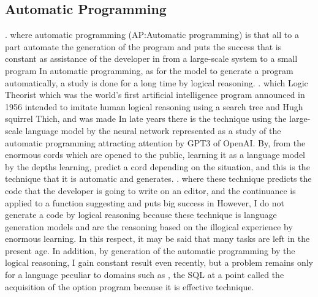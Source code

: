 \documentclass{article}
\begin{document}
\subsection{Automatic Programming}
\label{sec:headings}
\cite{AutomaticProgramming}. where automatic programming (AP:Automatic programming) is that all to a part automate the generation of the program and puts the success that is constant as assistance of the developer in from a large-scale system to a small program
In automatic programming, as for the model to generate a program automatically, a study is done for a long time by logical reasoning.
\cite{LogicTheorist}. which Logic Theorist which was the world's first artificial intelligence program announced in 1956 intended to imitate human logical reasoning using a search tree and Hugh squirrel Thich, and was made
In late years there is the technique using the large-scale language model by the neural network represented as a study of the automatic programming attracting attention by GPT3\cite{gpt3} of OpenAI.
By, from the enormous cords which are opened to the public, learning it as a language model by the depths learning, predict a cord depending on the situation, and this is the technique that it is automatic and generates.
\cite{copilot}. where these technique predicts the code that the developer is going to write on an editor, and the continuance is applied to a function suggesting and puts big success in
However, I do not generate a code by logical reasoning because these technique is language generation models and are the reasoning based on the illogical experience by enormous learning.
In this respect, it may be said that many tasks are left in the present age.
In addition, by generation of the automatic programming by the logical reasoning, I gain constant result even recently, but a problem remains only for a language peculiar to domains such as \cite{palsql}, the SQL at a point called the acquisition of the option program because it is effective technique.
\end{document}
